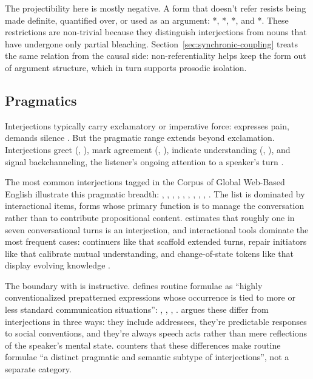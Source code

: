 \documentclass[12pt]{article}
\begin{document}
The projectibility here is mostly negative. A form that doesn't refer
resists being made definite, quantified over, or used as an argument:
*, *, *,
and *. These restrictions are non-trivial because
they distinguish interjections from nouns that have undergone only partial
bleaching. Section~\ref{sec:synchronic-coupling} treats the same relation from
the causal side: non-referentiality helps keep the form out of
argument structure, which in turn supports prosodic isolation.

\subsection{Pragmatics}

Interjections typically carry exclamatory or imperative force: 
expresses pain,  demands silence \citep[88]{quirk1985}. But
the pragmatic range extends beyond exclamation. Interjections greet
(, ), mark agreement (,
), indicate understanding (, ),
and signal backchanneling, the listener's ongoing attention to a speaker's
turn \citep{dingemanse2020, stivers2019}.

The most common interjections tagged in the Corpus of Global Web-Based
English \citep[GloWbE;][]{daviesfuchs2015} illustrate this pragmatic breadth: , ,
, , , , ,
, , . The list is dominated by
interactional items, forms whose primary function is to manage the
conversation rather than to contribute propositional content.
\textcite{dingemanse2024} estimates that roughly one in seven
conversational turns is an interjection, and interactional tools
dominate the most frequent cases: continuers like
 that scaffold extended turns, repair initiators like
 that calibrate mutual understanding, and change-of-state
tokens like  that display evolving knowledge
\citep[cf.][]{norrick2009}.

The boundary with  is instructive.
\textcite[2--3]{coulmas1981} defines routine formulae as
\enquote{highly conventionalized prepatterned expressions whose occurrence
is tied to more or less standard communication situations}:
, , , .
\textcite[109--110]{ameka1992} argues these differ from interjections in
three ways: they include addressees, they're predictable responses to social
conventions, and they're always speech acts rather than mere reflections of
the speaker's mental state. \textcite[142]{wilkins1992} counters that these
differences make routine formulae \enquote{a distinct pragmatic and semantic
subtype of interjections}, not a separate category.
\end{document}
